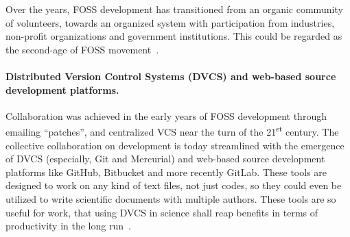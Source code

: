 Over the years, FOSS development has transitioned from an organic community of
volunteers, towards an organized system with participation from industries,
non-profit organizations and government institutions. This could be regarded as
the second-age of FOSS movement~\cite{fitzgerald_transformation_2006}.














\paragraph{Distributed Version Control Systems (DVCS) and web-based source
development platforms.}  Collaboration was achieved in the early years of FOSS
development through emailing ``patches'', and centralized VCS near the turn of
the 21\textsuperscript{st} century.  The collective collaboration on
development is today streamlined with the emergence of DVCS (especially, Git
and Mercurial) and web-based source development platforms like GitHub,
Bitbucket and more recently GitLab.
%
These tools are designed to work on any kind of text files, not just codes, so
they could even be utilized to write scientific documents with multiple authors.
%
These tools are so useful for work, that using DVCS in science shall reap
benefits in terms of productivity in the long run~\cite{wilson_best_2014}.


